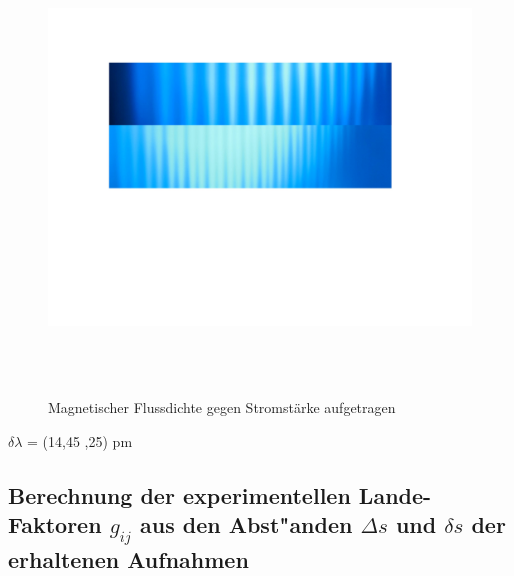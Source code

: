 \begin{figure}[h]
	\centering
	\includegraphics[width=16cm,height=12cm]{Fotos/V27_3.jpg}
	\caption{Magnetischer Flussdichte gegen Stromstärke aufgetragen}
	\label{plot:1}
\end{figure}

\begin{center}
$\delta \lambda$ = (14,45 ,25) pm
\end{center}


  \subsection{\texorpdfstring{Berechnung der experimentellen Lande-Faktoren $g_{ij}$ aus den Abst"anden $\Delta s$ und $\delta s$ der erhaltenen Aufnahmen}{Berechnung der experimentellen Lande-Faktoren g_{ij} aus den Abst"anden Delta s und delta s der erhaltenen Aufnahmen}}

